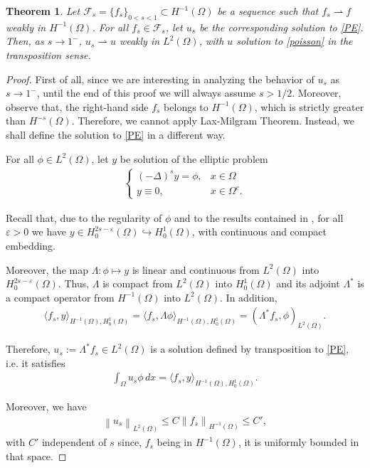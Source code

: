 \documentclass[reqno,twoside]{amsart}
\newtheorem{theorem}{Theorem}[section]
\numberwithin{equation}{section}
\newcommand{\norm}[2]{{\left\|#1\right\|}_{#2}}
\newcommand{\fl}[2]{(-\Delta)^#1#2}
\newcommand{\rouge}[1]{{\color{red}#1}}
\begin{document}
\begin{theorem}\label{limit_thm_weak}
Let $\mathcal F_s=\{f_s\}_{0<s<1}\subset H^{-1}(\Omega)$ be a sequence such that $f_s\rightharpoonup f$ weakly in $H^{-1}(\Omega)$. For all $f_s\in\mathcal F_s$, let $u_s$ be the corresponding solution to \eqref{PE}. Then, as $s\to 1^-$, $u_s\rightharpoonup u$ weakly in $L^2(\Omega)$, with $u$ solution to \eqref{poisson} in the transposition sense.
\end{theorem}

\begin{proof}
First of all, since we are interesting in analyzing the behavior of $u_s$ as $s\to 1^-$, until the end of this proof we will always assume $s>1/2$. Moreover, observe that, the right-hand side $f_s$ belongs to $H^{-1}(\Omega)$, which is strictly greater than $H^{-s}(\Omega)$. Therefore, we cannot apply Lax-Milgram Theorem. Instead, we shall define the solution to \eqref{PE} in a different way.

For all $\phi\in L^2(\Omega)$, let $y$ be solution of the elliptic problem 
\begin{align}\label{PE_transp}
	\begin{cases}
		\fl{s}{y}=\phi, & x\in\Omega
		\\
		y \equiv 0, & x\in\Omega^c.
	\end{cases}
\end{align}

Recall that, due to the regularity of $\phi$ and to the results contained in \cite{biccari2017local,cozzi2017interior}, for all $\varepsilon>0$ we have $y\in H^{2s-\varepsilon}_0(\Omega)\hookrightarrow H^1_0(\Omega)$, with continuous and compact embedding. 

Moreover, the map $\Lambda: \phi\mapsto y$ is linear and continuous from $L^2(\Omega)$ into $H^{2s-\varepsilon}_0(\Omega)$. Thus, $\Lambda$ is compact from $L^2(\Omega)$ into $H^1_0(\Omega)$ and its adjoint $\Lambda^*$ is a compact operator from $H^{-1}(\Omega)$ into $L^2(\Omega)$. In addition, 
\begin{align*}
	\langle f_s,y\rangle_{H^{-1}(\Omega),H^1_0(\Omega)} = \langle f_s,\Lambda \phi\rangle_{H^{-1}(\Omega),H^1_0(\Omega)} = (\Lambda^* f_s,\phi)_{L^2(\Omega)}.
\end{align*}

Therefore, $u_s:=\Lambda^*f_s\in L^2(\Omega)$ is a solution defined by transposition to \eqref{PE}, i.e. it satisfies
\begin{align}\label{transp_def_s}
	\int_\Omega u_s\phi\,dx = \langle f_s,y\rangle_{H^{-1}(\Omega),H^1_0(\Omega)}. 
\end{align}
\rouge{ 
Moreover, we have 
\begin{align}\label{us_norm}
	\norm{u_s}{L^2(\Omega)} \leq C\norm{f_s}{H^{-1}(\Omega)}\leq C',
\end{align}
with $C'$ independent of $s$ since, $f_s$ being in $H^{-1}(\Omega)$, it is uniformly bounded in that space. 

}
\end{proof}
\end{document}
